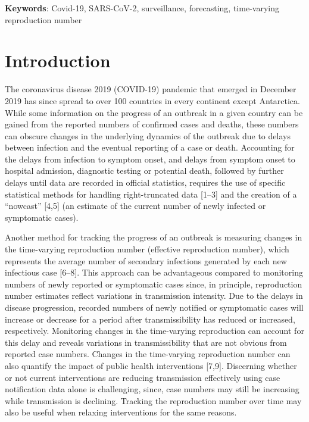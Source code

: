 \documentclass[
]{article}
\begin{document}
\textbf{Keywords}: Covid-19, SARS-CoV-2, surveillance, forecasting,
time-varying reproduction number

\hypertarget{introduction}{%
\section{Introduction}\label{introduction}}

The coronavirus disease 2019 (COVID-19) pandemic that emerged in
December 2019 has since spread to over 100 countries in every continent
except Antarctica. While some information on the progress of an outbreak
in a given country can be gained from the reported numbers of confirmed
cases and deaths, these numbers can obscure changes in the underlying
dynamics of the outbreak due to delays between infection and the
eventual reporting of a case or death. Accounting for the delays from
infection to symptom onset, and delays from symptom onset to hospital
admission, diagnostic testing or potential death, followed by further
delays until data are recorded in official statistics, requires the use
of specific statistical methods for handling right-truncated data
{[}1--3{]} and the creation of a ``nowcast'' {[}4,5{]} (an estimate of
the current number of newly infected or symptomatic cases).

Another method for tracking the progress of an outbreak is measuring
changes in the time-varying reproduction number (effective reproduction
number), which represents the average number of secondary infections
generated by each new infectious case {[}6--8{]}. This approach can be
advantageous compared to monitoring numbers of newly reported or
symptomatic cases since, in principle, reproduction number estimates
reflect variations in transmission intensity. Due to the delays in
disease progression, recorded numbers of newly notified or symptomatic
cases will increase or decrease for a period after transmissibility has
reduced or increased, respectively. Monitoring changes in the
time-varying reproduction can account for this delay and reveals
variations in transmissibility that are not obvious from reported case
numbers. Changes in the time-varying reproduction number can also
quantify the impact of public health interventions {[}7,9{]}. Discerning
whether or not current interventions are reducing transmission
effectively using case notification data alone is challenging, since,
case numbers may still be increasing while transmission is declining.
Tracking the reproduction number over time may also be useful when
relaxing interventions for the same reasons.
\end{document}
